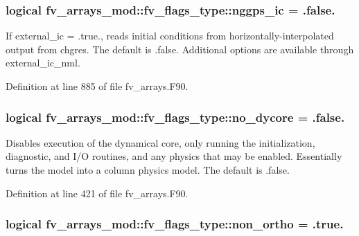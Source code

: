 \subsubsection[{nggps\-\_\-ic}]{\setlength{\rightskip}{0pt plus 5cm}logical fv\-\_\-arrays\-\_\-mod\-::fv\-\_\-flags\-\_\-type\-::nggps\-\_\-ic = .false.}\label{structfv__arrays__mod_1_1fv__flags__type_a55364a34def550dcbeee0f6da94186ef}


If external\-\_\-ic = .true., reads initial conditions from horizontally-\/interpolated output from chgres. The default is .false. Additional options are available through external\-\_\-ic\-\_\-nml. 



Definition at line 885 of file fv\-\_\-arrays.\-F90.

\subsubsection[{no\-\_\-dycore}]{\setlength{\rightskip}{0pt plus 5cm}logical fv\-\_\-arrays\-\_\-mod\-::fv\-\_\-flags\-\_\-type\-::no\-\_\-dycore = .false.}\label{structfv__arrays__mod_1_1fv__flags__type_a0a66c1a0702f0b0f039d879e1bf70dec}


Disables execution of the dynamical core, only running the initialization, diagnostic, and I/\-O routines, and any physics that may be enabled. Essentially turns the model into a column physics model. The default is .false. 



Definition at line 421 of file fv\-\_\-arrays.\-F90.

\subsubsection[{non\-\_\-ortho}]{\setlength{\rightskip}{0pt plus 5cm}logical fv\-\_\-arrays\-\_\-mod\-::fv\-\_\-flags\-\_\-type\-::non\-\_\-ortho = .true.}\label{structfv__arrays__mod_1_1fv__flags__type_a2d1ec9358d2350da3427de40c7e9dc0b}


